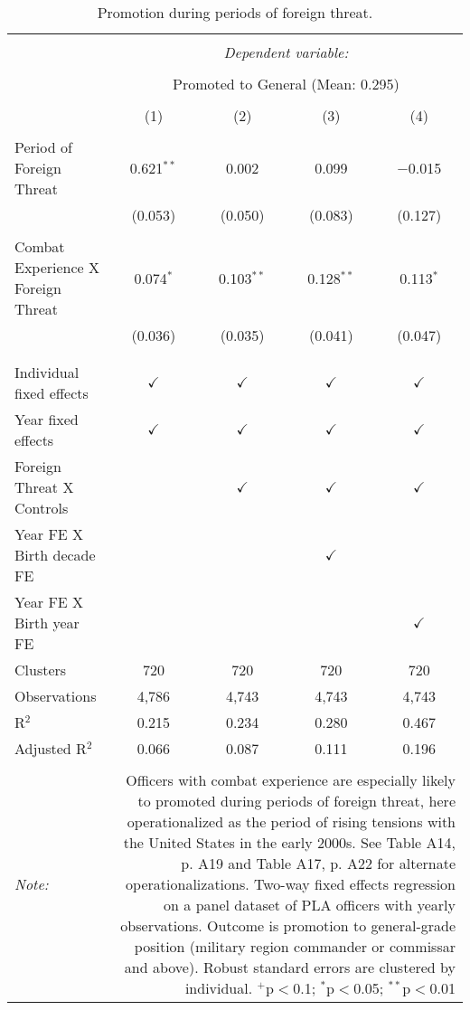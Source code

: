 
\begin{table}[!htbp] \centering 
  \caption{Promotion during periods of foreign threat.} 
  \label{foreign_threat} 
\begin{tabular}{@{\extracolsep{5pt}}lcccc} 
\\[-1.8ex]\hline 
\hline \\[-1.8ex] 
 & \multicolumn{4}{c}{\textit{Dependent variable:}} \\ 
\cline{2-5} 
\\[-1.8ex] & \multicolumn{4}{c}{Promoted to General (Mean: 0.295)} \\ 
\\[-1.8ex] & (1) & (2) & (3) & (4)\\ 
\hline \\[-1.8ex] 
 Period of Foreign Threat & 0.621$^{**}$ & 0.002 & 0.099 & $-$0.015 \\ 
  & (0.053) & (0.050) & (0.083) & (0.127) \\ 
  & & & & \\ 
 Combat Experience X Foreign Threat & 0.074$^{*}$ & 0.103$^{**}$ & 0.128$^{**}$ & 0.113$^{*}$ \\ 
  & (0.036) & (0.035) & (0.041) & (0.047) \\ 
  & & & & \\ 
\hline \\[-1.8ex] 
Individual fixed effects & $\checkmark$ & $\checkmark$ & $\checkmark$ & $\checkmark$ \\ 
Year fixed effects & $\checkmark$ & $\checkmark$ & $\checkmark$ & $\checkmark$ \\ 
Foreign Threat X Controls &  & $\checkmark$ & $\checkmark$ & $\checkmark$ \\ 
Year FE X Birth decade FE &  &  & $\checkmark$ &  \\ 
Year FE X Birth year FE &  &  &  & $\checkmark$ \\ 
Clusters & 720 & 720 & 720 & 720 \\ 
Observations & 4,786 & 4,743 & 4,743 & 4,743 \\ 
R$^{2}$ & 0.215 & 0.234 & 0.280 & 0.467 \\ 
Adjusted R$^{2}$ & 0.066 & 0.087 & 0.111 & 0.196 \\ 
\hline 
\hline \\[-1.8ex] 
\textit{Note:}  & \multicolumn{4}{r}{Officers with combat experience are especially likely to promoted during periods of foreign threat, here operationalized as the period of rising tensions with the United States in the early 2000s. See Table A14, p. A19 and Table A17, p. A22 for alternate operationalizations.  Two-way fixed effects regression on a panel dataset of PLA officers with yearly observations. Outcome is promotion to general-grade position (military region commander or commissar and above). Robust standard errors are clustered by individual. $^{+}$p$<$0.1; $^{*}$p$<$0.05; $^{**}$p$<$0.01}} \\ 
\end{tabular} 
\end{table} 
